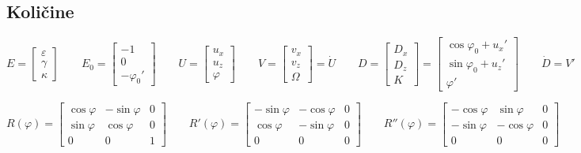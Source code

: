 \documentclass[a4paper,6pt]{article}
\begin{document}
\begin{flushleft}

\section{Količine}
$$E=\begin{bmatrix}
    \varepsilon \\
    \gamma \\
    \kappa
  \end{bmatrix} 
\qquad 
E_0=\begin{bmatrix}
  -1 \\
  0 \\
  -\varphi_0'
\end{bmatrix} 
\qquad 
U = \begin{bmatrix}
  u_x \\
  u_z \\
  \varphi
\end{bmatrix}
\qquad 
V = \begin{bmatrix}
  v_x \\
  v_z \\
  \Omega
\end{bmatrix} = \dot{U}
\qquad
D = \begin{bmatrix}
  D_x \\
  D_z \\
  K
\end{bmatrix} 
= \begin{bmatrix}
  \cos\varphi_0 +u_x'\\
  \sin\varphi_0 +u_z'\\
  \varphi'
\end{bmatrix}
\qquad
\dot{D} = V'
$$

$$R(\varphi)=\begin{bmatrix}
    \cos\varphi & -\sin\varphi & 0 \\
    \sin\varphi & \cos\varphi & 0 \\
    0 & 0 & 1
  \end{bmatrix} 
\qquad 
  R'(\varphi)=\begin{bmatrix}
  -\sin\varphi & -\cos\varphi & 0 \\
  \cos\varphi & -\sin\varphi & 0 \\
  0 & 0 & 0
\end{bmatrix} 
\qquad 
  R''(\varphi)=\begin{bmatrix}
  -\cos\varphi & \sin\varphi & 0 \\
  -\sin\varphi & -\cos\varphi & 0 \\
  0 & 0 & 0
\end{bmatrix}
$$


\end{flushleft}
\end{document}
